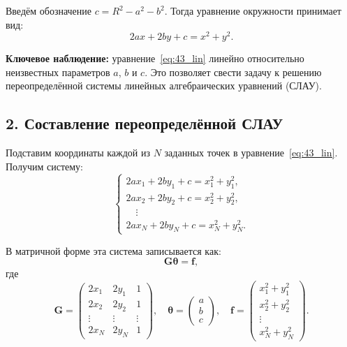 \documentclass{article}
\begin{document}
Введём обозначение $c = R^2 - a^2 - b^2$. Тогда уравнение окружности принимает вид:
\begin{equation}
2ax + 2by + c = x^2 + y^2.
\label{eq:43_lin}
\end{equation}

\textbf{Ключевое наблюдение:} уравнение~\eqref{eq:43_lin} линейно относительно неизвестных параметров $a$, $b$ и $c$. Это позволяет свести задачу к решению переопределённой системы линейных алгебраических уравнений (СЛАУ).

\subsection*{2. Составление переопределённой СЛАУ}

Подставим координаты каждой из $N$ заданных точек в уравнение~\eqref{eq:43_lin}. Получим систему:
\begin{equation}
\begin{cases}
2a x_1 + 2b y_1 + c = x_1^2 + y_1^2, \\
2a x_2 + 2b y_2 + c = x_2^2 + y_2^2, \\
\quad \vdots \\
2a x_N + 2b y_N + c = x_N^2 + y_N^2.
\end{cases}
\end{equation}

В матричной форме эта система записывается как:
\begin{equation}
\mathbf{G} \boldsymbol{\theta} = \mathbf{f},
\label{eq:43_slau}
\end{equation}
где
\begin{equation}
\mathbf{G} =
\begin{pmatrix}
2x_1 & 2y_1 & 1 \\
2x_2 & 2y_2 & 1 \\
\vdots & \vdots & \vdots \\
2x_N & 2y_N & 1
\end{pmatrix}, \quad
\boldsymbol{\theta} =
\begin{pmatrix}
a \\ b \\ c
\end{pmatrix}, \quad
\mathbf{f} =
\begin{pmatrix}
x_1^2 + y_1^2 \\
x_2^2 + y_2^2 \\
\vdots \\
x_N^2 + y_N^2
\end{pmatrix}.
\end{equation}
\end{document}
